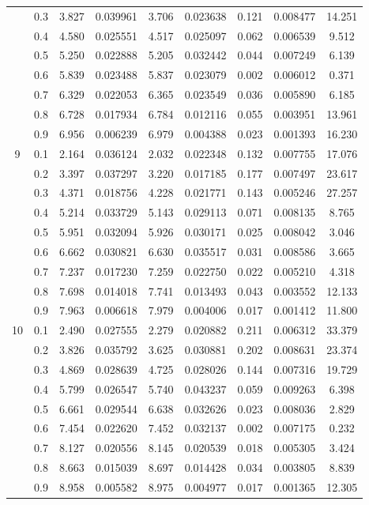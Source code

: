 \begin{longtable}{ | c | c || c | c | c | c | c | c | c | }
 & 0.3 & 3.827 & 0.039961 & 3.706 & 0.023638 & 0.121 & 0.008477 & 14.251 \\
 & 0.4 & 4.580 & 0.025551 & 4.517 & 0.025097 & 0.062 & 0.006539 & 9.512 \\
 & 0.5 & 5.250 & 0.022888 & 5.205 & 0.032442 & 0.044 & 0.007249 & 6.139 \\
 & 0.6 & 5.839 & 0.023488 & 5.837 & 0.023079 & 0.002 & 0.006012 & 0.371 \\
 & 0.7 & 6.329 & 0.022053 & 6.365 & 0.023549 & 0.036 & 0.005890 & 6.185 \\
 & 0.8 & 6.728 & 0.017934 & 6.784 & 0.012116 & 0.055 & 0.003951 & 13.961 \\
 & 0.9 & 6.956 & 0.006239 & 6.979 & 0.004388 & 0.023 & 0.001393 & 16.230 \\
 \hline
\multirow{9}{*}{9} & 0.1 & 2.164 & 0.036124 & 2.032 & 0.022348 & 0.132 & 0.007755 & 17.076 \\
 & 0.2 & 3.397 & 0.037297 & 3.220 & 0.017185 & 0.177 & 0.007497 & 23.617 \\
 & 0.3 & 4.371 & 0.018756 & 4.228 & 0.021771 & 0.143 & 0.005246 & 27.257 \\
 & 0.4 & 5.214 & 0.033729 & 5.143 & 0.029113 & 0.071 & 0.008135 & 8.765 \\
 & 0.5 & 5.951 & 0.032094 & 5.926 & 0.030171 & 0.025 & 0.008042 & 3.046 \\
 & 0.6 & 6.662 & 0.030821 & 6.630 & 0.035517 & 0.031 & 0.008586 & 3.665 \\
 & 0.7 & 7.237 & 0.017230 & 7.259 & 0.022750 & 0.022 & 0.005210 & 4.318 \\
 & 0.8 & 7.698 & 0.014018 & 7.741 & 0.013493 & 0.043 & 0.003552 & 12.133 \\
 & 0.9 & 7.963 & 0.006618 & 7.979 & 0.004006 & 0.017 & 0.001412 & 11.800 \\
 \hline
\multirow{9}{*}{10} & 0.1 & 2.490 & 0.027555 & 2.279 & 0.020882 & 0.211 & 0.006312 & 33.379 \\
 & 0.2 & 3.826 & 0.035792 & 3.625 & 0.030881 & 0.202 & 0.008631 & 23.374 \\
 & 0.3 & 4.869 & 0.028639 & 4.725 & 0.028026 & 0.144 & 0.007316 & 19.729 \\
 & 0.4 & 5.799 & 0.026547 & 5.740 & 0.043237 & 0.059 & 0.009263 & 6.398 \\
 & 0.5 & 6.661 & 0.029544 & 6.638 & 0.032626 & 0.023 & 0.008036 & 2.829 \\
 & 0.6 & 7.454 & 0.022620 & 7.452 & 0.032137 & 0.002 & 0.007175 & 0.232 \\
 & 0.7 & 8.127 & 0.020556 & 8.145 & 0.020539 & 0.018 & 0.005305 & 3.424 \\
 & 0.8 & 8.663 & 0.015039 & 8.697 & 0.014428 & 0.034 & 0.003805 & 8.839 \\
 & 0.9 & 8.958 & 0.005582 & 8.975 & 0.004977 & 0.017 & 0.001365 & 12.305 \\
 \hline
\hline
\end{longtable}
 
